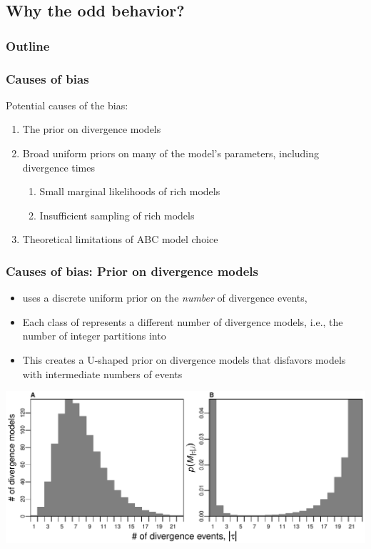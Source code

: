 \subsection{Why the odd behavior?}

\begin{frame}
\frametitle{Outline}
\end{frame}

\begin{frame}
    \frametitle{Causes of bias}
    Potential causes of the bias:
    \begin{enumerate}
        \item The prior on divergence models
        \item Broad uniform priors on many of the model's parameters, including
            divergence times
            \begin{enumerate}
                \item Small marginal likelihoods of rich models
                \item Insufficient sampling of rich models
            \end{enumerate}
        \item Theoretical limitations of ABC model choice
    \end{enumerate}
\end{frame}

\begin{frame}
    \frametitle{Causes of bias: Prior on divergence models}
    \begin{itemize}
        \item \msb uses a discrete uniform prior on the \emph{number} of
            divergence events, \divTimeNum
        \item Each class of \divTimeNum represents a different number of
            divergence models, i.e., the number of integer partitions
            \divTimeNum into \npairs{}
        \item This creates a U-shaped prior on divergence models that disfavors
            models with intermediate numbers of events
    \end{itemize}
    \centerline{
    \includegraphics[width=\textwidth]{images/partition_numbers.pdf}}
\end{frame}


